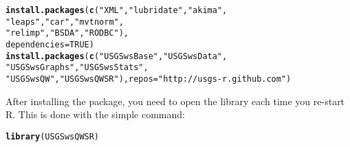 \documentclass[a4paper,11pt]{article}\usepackage[]{graphicx}\usepackage[]{color}
\makeatletter
\newcommand{\hlnum}[1]{\textcolor[rgb]{0.686,0.059,0.569}{#1}}%
\newcommand{\hlstr}[1]{\textcolor[rgb]{0.192,0.494,0.8}{#1}}%
\newcommand{\hlstd}[1]{\textcolor[rgb]{0.345,0.345,0.345}{#1}}%
\newcommand{\hlkwc}[1]{\textcolor[rgb]{0.333,0.667,0.333}{#1}}%
\newcommand{\hlkwd}[1]{\textcolor[rgb]{0.737,0.353,0.396}{\textbf{#1}}}%
\newenvironment{kframe}{%
 \def\at@end@of@kframe{}%
 \ifinner\ifhmode%
  \def\at@end@of@kframe{\end{minipage}}%
  \begin{minipage}{\columnwidth}%
 \fi\fi%
 \def\FrameCommand##1{\hskip\@totalleftmargin \hskip-\fboxsep
 \colorbox{shadecolor}{##1}\hskip-\fboxsep
     \hskip-\linewidth \hskip-\@totalleftmargin \hskip\columnwidth}%
 \MakeFramed {\advance\hsize-\width
   \@totalleftmargin\z@ \linewidth\hsize
   \@setminipage}}%
 {\par\unskip\endMakeFramed%
 \at@end@of@kframe}
\newenvironment{knitrout}{}{} %
\makeatother
\begin{document}
\begin{knitrout}
\color{fgcolor}\begin{kframe}
\begin{alltt}
\hlkwd{install.packages}\hlstd{(}\hlkwd{c}\hlstd{(}\hlstr{"XML"}\hlstd{,} \hlstr{"lubridate"}\hlstd{,} \hlstr{"akima"}\hlstd{,}
                   \hlstr{"leaps"}\hlstd{,} \hlstr{"car"}\hlstd{,} \hlstr{"mvtnorm"}\hlstd{,}
                   \hlstr{"relimp"}\hlstd{,} \hlstr{"BSDA"}\hlstd{,} \hlstr{"RODBC"}\hlstd{),}
                 \hlkwc{dependencies}\hlstd{=}\hlnum{TRUE}\hlstd{)}
\hlkwd{install.packages}\hlstd{(}\hlkwd{c}\hlstd{(}\hlstr{"USGSwsBase"}\hlstd{,}\hlstr{"USGSwsData"}\hlstd{,}
                   \hlstr{"USGSwsGraphs"}\hlstd{,}\hlstr{"USGSwsStats"}\hlstd{,}
                   \hlstr{"USGSwsQW"}\hlstd{,}\hlstr{"USGSwsQWSR"}\hlstd{),} \hlkwc{repos}\hlstd{=}\hlstr{"http://usgs-r.github.com"}\hlstd{)}
\end{alltt}
\end{kframe}
\end{knitrout}



After installing the package, you need to open the library each time you re-start R.  This is done with the simple command:
\begin{knitrout}
\color{fgcolor}\begin{kframe}
\begin{alltt}
\hlkwd{library}\hlstd{(USGSwsQWSR)}
\end{alltt}
\end{kframe}
\end{knitrout}
\end{document}
